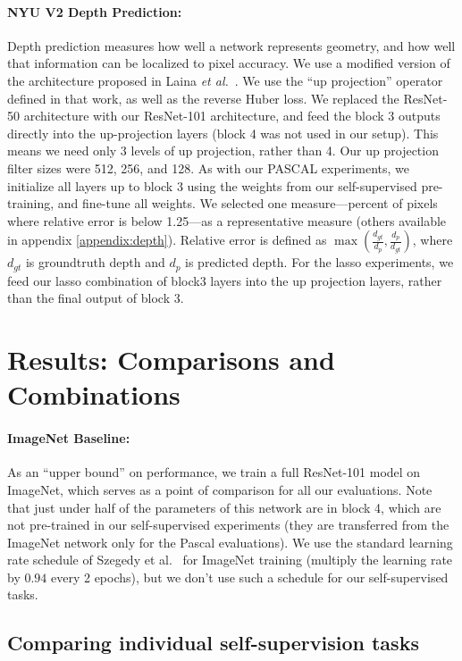 \documentclass[10pt,twocolumn,letterpaper]{article}
\begin{document}
\paragraph{NYU V2 Depth Prediction:}
Depth prediction measures how well a network represents geometry, and how well that information can be localized to pixel accuracy.
We use a modified version of the architecture proposed in Laina {\it et al.}~\cite{laina2016deeper}.
We use the ``up projection'' operator defined in that work, as well as the reverse Huber loss.
We replaced the ResNet-50 architecture with our ResNet-101 architecture, and feed the block 3 outputs directly into the up-projection layers (block 4 was not used in our setup).
This means we need only 3 levels of up projection, rather than 4.
Our up projection filter sizes were 512, 256, and 128.
As with our PASCAL experiments, we initialize all layers up to block 3 using the weights from our self-supervised pre-training, and fine-tune all weights.
We selected one measure---percent of pixels where relative error is below 1.25---as a representative measure (others available in appendix \ref{appendix:depth}).
Relative error is defined as $\max\left(\frac{d_{gt}}{d_{p}},\frac{d_{p}}{d_{gt}}\right)$, where $d_{gt}$ is groundtruth depth and $d_{p}$ is predicted depth.
For the lasso experiments, we feed our lasso combination of block3 layers into the up projection layers, rather than the final output of block 3.


\section{Results: Comparisons and Combinations}

\label{sec:results}
\paragraph{ImageNet Baseline:} As an ``upper bound'' 
on performance, we train a full ResNet-101 model on ImageNet, which
serves as a point of comparison for all our evaluations.  Note that
just under half of the parameters of this network are in block 4,
which are not pre-trained in our self-supervised experiments 
(they are transferred from the ImageNet network only for the Pascal evaluations). 
We use the
standard learning rate schedule of Szegedy et
al.~\cite{szegedy2016inception} for ImageNet training (multiply the
learning rate by $0.94$ every 2 epochs), but we don't use such a schedule
for our self-supervised tasks.

\subsection{Comparing individual self-supervision tasks}
\end{document}
